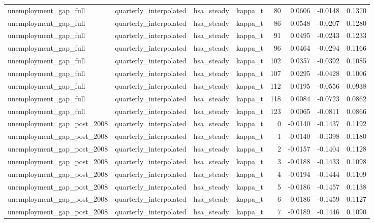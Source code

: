 \begin{tabular}{llllrrrr}
unemployment\_gap\_full & quarterly\_interpolated & hsa\_steady & kappa\_t & 80 & 0.0606 & -0.0148 & 0.1370 \\
unemployment\_gap\_full & quarterly\_interpolated & hsa\_steady & kappa\_t & 86 & 0.0548 & -0.0207 & 0.1280 \\
unemployment\_gap\_full & quarterly\_interpolated & hsa\_steady & kappa\_t & 91 & 0.0495 & -0.0243 & 0.1233 \\
unemployment\_gap\_full & quarterly\_interpolated & hsa\_steady & kappa\_t & 96 & 0.0464 & -0.0294 & 0.1166 \\
unemployment\_gap\_full & quarterly\_interpolated & hsa\_steady & kappa\_t & 102 & 0.0357 & -0.0392 & 0.1085 \\
unemployment\_gap\_full & quarterly\_interpolated & hsa\_steady & kappa\_t & 107 & 0.0295 & -0.0428 & 0.1006 \\
unemployment\_gap\_full & quarterly\_interpolated & hsa\_steady & kappa\_t & 112 & 0.0195 & -0.0556 & 0.0938 \\
unemployment\_gap\_full & quarterly\_interpolated & hsa\_steady & kappa\_t & 118 & 0.0084 & -0.0723 & 0.0862 \\
unemployment\_gap\_full & quarterly\_interpolated & hsa\_steady & kappa\_t & 123 & 0.0065 & -0.0811 & 0.0866 \\
unemployment\_gap\_post\_2008 & quarterly\_interpolated & hsa\_steady & kappa\_t & 0 & -0.0140 & -0.1437 & 0.1192 \\
unemployment\_gap\_post\_2008 & quarterly\_interpolated & hsa\_steady & kappa\_t & 1 & -0.0140 & -0.1398 & 0.1180 \\
unemployment\_gap\_post\_2008 & quarterly\_interpolated & hsa\_steady & kappa\_t & 2 & -0.0157 & -0.1404 & 0.1128 \\
unemployment\_gap\_post\_2008 & quarterly\_interpolated & hsa\_steady & kappa\_t & 3 & -0.0188 & -0.1433 & 0.1098 \\
unemployment\_gap\_post\_2008 & quarterly\_interpolated & hsa\_steady & kappa\_t & 4 & -0.0194 & -0.1444 & 0.1109 \\
unemployment\_gap\_post\_2008 & quarterly\_interpolated & hsa\_steady & kappa\_t & 5 & -0.0186 & -0.1457 & 0.1138 \\
unemployment\_gap\_post\_2008 & quarterly\_interpolated & hsa\_steady & kappa\_t & 6 & -0.0186 & -0.1459 & 0.1127 \\
unemployment\_gap\_post\_2008 & quarterly\_interpolated & hsa\_steady & kappa\_t & 7 & -0.0189 & -0.1446 & 0.1090 \\

\end{tabular}
